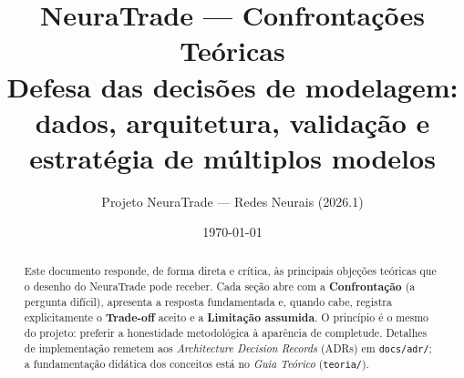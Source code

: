 \documentclass[11pt,a4paper]{article}
\title{\textbf{NeuraTrade --- Confrontações Teóricas}\\[0.3em]
\large Defesa das decisões de modelagem: dados, arquitetura, validação e
estratégia de múltiplos modelos}
\author{Projeto NeuraTrade --- Redes Neurais (2026.1)}
\date{\today}
\theoremstyle{definition}
\begin{document}
\maketitle

\begin{abstract}
\noindent Este documento responde, de forma direta e crítica, às principais
objeções teóricas que o desenho do NeuraTrade pode receber. Cada seção abre com
a \textbf{Confrontação} (a pergunta difícil), apresenta a resposta fundamentada
e, quando cabe, registra explicitamente o \textbf{Trade-off} aceito e a
\textbf{Limitação assumida}. O princípio é o mesmo do projeto: preferir a
honestidade metodológica à aparência de completude. Detalhes de implementação
remetem aos \emph{Architecture Decision Records} (ADRs) em \texttt{docs/adr/};
a fundamentação didática dos conceitos está no \emph{Guia Teórico}
(\texttt{teoria/}).
\end{abstract}

\tableofcontents
\newpage










\end{document}
